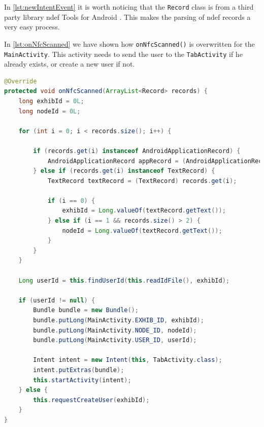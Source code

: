 In \autoref{lst:newIntentEvent} it is worth noticing that the \lstinline|Record| class is from a third party library \ac{ndef} Tools for Android \citep{ndeftools}. This makes the parsing of \ac{ndef} records a very easy process.

In \autoref{lst:onNfcScanned} we have shown how \lstinline|onNfcScanned()| is overwritten for the \lstinline|MainActivity|. This activity needs to send the user to the \lstinline|TabActivity| if he already exists, or create a new user if not.

\begin{lstlisting}[language=java, label=lst:onNfcScanned, caption=onNfcScanned]
@Override
protected void onNfcScanned(ArrayList<Record> records) {
    long exhibId = 0L;
    long nodeId = 0L;

    for (int i = 0; i < records.size(); i++) {

        if (records.get(i) instanceof AndroidApplicationRecord) {
            AndroidApplicationRecord appRecord = (AndroidApplicationRecord) records.get(i);
        } else if (records.get(i) instanceof TextRecord) {
            TextRecord textRecord = (TextRecord) records.get(i);

            if (i == 0) {
                exhibId = Long.valueOf(textRecord.getText());
            } else if (i == 1 && records.size() > 2) {
                nodeId = Long.valueOf(textRecord.getText());
            }
        }
    }

    Long userId = this.findUserId(this.readIdFile(), exhibId);

    if (userId != null) {
        Bundle bundle = new Bundle();
        bundle.putLong(MainActivity.EXHIB_ID, exhibId);
        bundle.putLong(MainActivity.NODE_ID, nodeId);
        bundle.putLong(MainActivity.USER_ID, userId);

        Intent intent = new Intent(this, TabActivity.class);
        intent.putExtras(bundle);
        this.startActivity(intent);
    } else {
        this.requestCreateUser(exhibId);
    }
}
\end{lstlisting}
